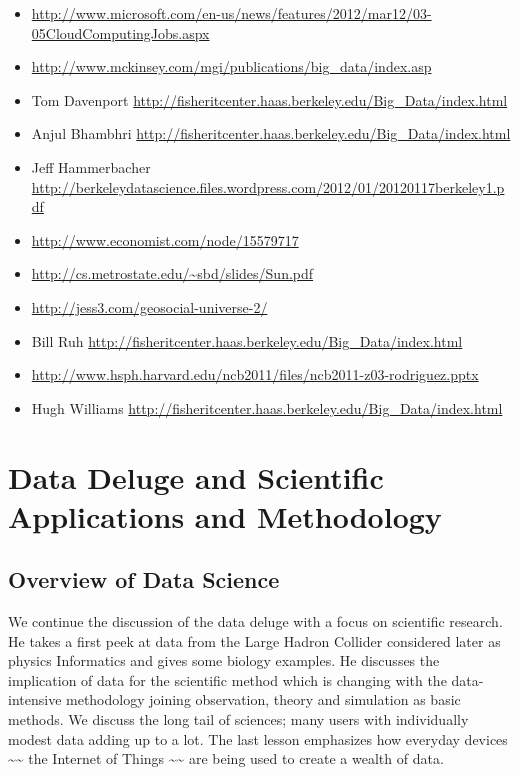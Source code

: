 \begin{itemize}
\item
  \url{http://www.microsoft.com/en-us/news/features/2012/mar12/03-05CloudComputingJobs.aspx}
\item
  \url{http://www.mckinsey.com/mgi/publications/big_data/index.asp}
\item
  Tom Davenport
  \url{http://fisheritcenter.haas.berkeley.edu/Big_Data/index.html}
\item
  Anjul Bhambhri
  \url{http://fisheritcenter.haas.berkeley.edu/Big_Data/index.html}
\item
  Jeff Hammerbacher
  \url{http://berkeleydatascience.files.wordpress.com/2012/01/20120117berkeley1.pdf}
\item
  \url{http://www.economist.com/node/15579717}
\item
  \url{http://cs.metrostate.edu/~sbd/slides/Sun.pdf}
\item
  \url{http://jess3.com/geosocial-universe-2/}
\item
  Bill Ruh \url{http://fisheritcenter.haas.berkeley.edu/Big\_Data/index.html}
\item
  \url{http://www.hsph.harvard.edu/ncb2011/files/ncb2011-z03-rodriguez.pptx}
\item
  Hugh Williams
  \url{http://fisheritcenter.haas.berkeley.edu/Big_Data/index.html}
\end{itemize}

\section{Data Deluge and Scientific Applications and
Methodology}\label{data-deluge-and-scientific-applications-and-methodology}

\subsection{Overview of Data Science}\label{overview}

We continue the discussion of the data deluge with a focus on scientific
research. He takes a first peek at data from the Large Hadron Collider
considered later as physics Informatics and gives some biology examples.
He discusses the implication of data for the scientific method which is
changing with the data-intensive methodology joining observation, theory
and simulation as basic methods. We discuss the long tail of sciences;
many users with individually modest data adding up to a lot. The last
lesson emphasizes how everyday devices
\textasciitilde{}\textasciitilde{} the Internet of Things
\textasciitilde{}\textasciitilde{} are being used to create a wealth of
data.

